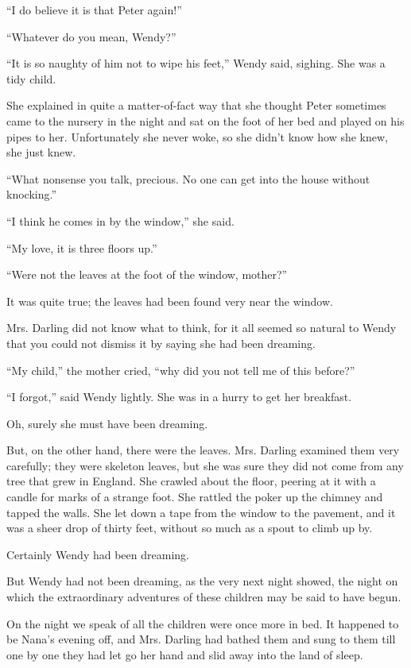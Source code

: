 ``I do believe it is that Peter again!''

``Whatever do you mean, Wendy?''

``It is so naughty of him not to wipe his feet,'' Wendy said, sighing.
She was a tidy child.

She explained in quite a matter-of-fact way that she thought Peter sometimes came to the nursery in the night and sat on the foot of her bed and played on his pipes to her.
Unfortunately she never woke, so she didn't know how she knew, she just knew.

``What nonsense you talk, precious.
No one can get into the house without knocking.''

``I think he comes in by the window,'' she said.

``My love, it is three floors up.''

``Were not the leaves at the foot of the window, mother?''

It was quite true; the leaves had been found very near the window.

Mrs. Darling did not know what to think, for it all seemed so natural to Wendy that you could not dismiss it by saying she had been dreaming.

``My child,'' the mother cried, ``why did you not tell me of this before?''

``I forgot,'' said Wendy lightly. She was in a hurry to get her breakfast.

Oh, surely she must have been dreaming.

But, on the other hand, there were the leaves.
Mrs. Darling examined them very carefully; they were skeleton leaves, but she was sure they did not come from any tree that grew in England. She crawled about the floor, peering at it with a candle for marks of a strange foot.
She rattled the poker up the chimney and tapped the walls.
She let down a tape from the window to the pavement, and it was a sheer drop of thirty feet, without so much as a spout to climb up by.

Certainly Wendy had been dreaming.

But Wendy had not been dreaming, as the very next night showed, the night on which the extraordinary adventures of these children may be said to have begun.

On the night we speak of all the children were once more in bed.
It happened to be Nana's evening off, and Mrs. Darling had bathed them and sung to them till one by one they had let go her hand and slid away into the land of sleep.

